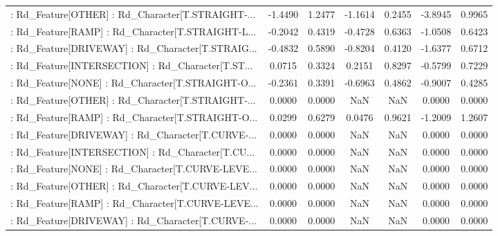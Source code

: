 \begin{longtable}{p{4cm}cccccc}
 : Rd\_Feature[OTHER] : Rd\_Character[T.STRAIGHT-... &           -1.4490 &            1.2477 & -1.1614 &       0.2455 &            -3.8945 &            0.9965 \\
 : Rd\_Feature[RAMP] : Rd\_Character[T.STRAIGHT-L... &           -0.2042 &            0.4319 & -0.4728 &       0.6363 &            -1.0508 &            0.6423 \\
 : Rd\_Feature[DRIVEWAY] : Rd\_Character[T.STRAIG... &           -0.4832 &            0.5890 & -0.8204 &       0.4120 &            -1.6377 &            0.6712 \\
 : Rd\_Feature[INTERSECTION] : Rd\_Character[T.ST... &            0.0715 &            0.3324 &  0.2151 &       0.8297 &            -0.5799 &            0.7229 \\
 : Rd\_Feature[NONE] : Rd\_Character[T.STRAIGHT-O... &           -0.2361 &            0.3391 & -0.6963 &       0.4862 &            -0.9007 &            0.4285 \\
 : Rd\_Feature[OTHER] : Rd\_Character[T.STRAIGHT-... &            0.0000 &            0.0000 &     NaN &          NaN &             0.0000 &            0.0000 \\
 : Rd\_Feature[RAMP] : Rd\_Character[T.STRAIGHT-O... &            0.0299 &            0.6279 &  0.0476 &       0.9621 &            -1.2009 &            1.2607 \\
 : Rd\_Feature[DRIVEWAY] : Rd\_Character[T.CURVE-... &            0.0000 &            0.0000 &     NaN &          NaN &             0.0000 &            0.0000 \\
 : Rd\_Feature[INTERSECTION] : Rd\_Character[T.CU... &            0.0000 &            0.0000 &     NaN &          NaN &             0.0000 &            0.0000 \\
 : Rd\_Feature[NONE] : Rd\_Character[T.CURVE-LEVE... &            0.0000 &            0.0000 &     NaN &          NaN &             0.0000 &            0.0000 \\
 : Rd\_Feature[OTHER] : Rd\_Character[T.CURVE-LEV... &            0.0000 &            0.0000 &     NaN &          NaN &             0.0000 &            0.0000 \\
 : Rd\_Feature[RAMP] : Rd\_Character[T.CURVE-LEVE... &            0.0000 &            0.0000 &     NaN &          NaN &             0.0000 &            0.0000 \\
 : Rd\_Feature[DRIVEWAY] : Rd\_Character[T.CURVE-... &            0.0000 &            0.0000 &     NaN &          NaN &             0.0000 &            0.0000 \\

\end{longtable}
